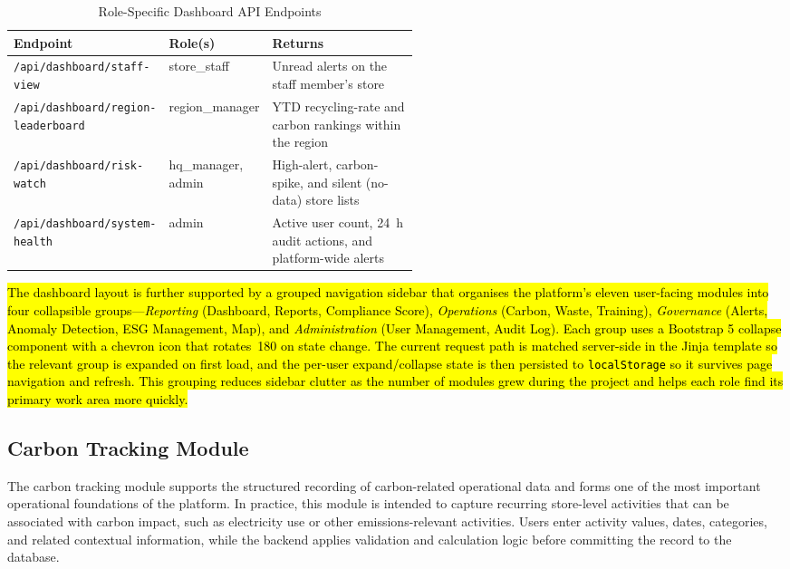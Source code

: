 \documentclass[11pt,a4paper]{article}
\newcommand{\new}[1]{\hl{#1}}
\begin{document}
\begin{table}[h]
\centering
\scriptsize
\begin{tabularx}{\linewidth}{@{}p{0.32\linewidth}p{0.20\linewidth}X@{}}
\toprule
\textbf{Endpoint} & \textbf{Role(s)} & \textbf{Returns} \\
\midrule
\rowcolor{yellow!40}
\texttt{/api/dashboard/staff-view} & store\_staff & Unread alerts on the staff member's store \\
\rowcolor{yellow!40}
\texttt{/api/dashboard/region-leaderboard} & region\_manager & YTD recycling-rate and carbon rankings within the region \\
\rowcolor{yellow!40}
\texttt{/api/dashboard/risk-watch} & hq\_manager, admin & High-alert, carbon-spike, and silent (no-data) store lists \\
\rowcolor{yellow!40}
\texttt{/api/dashboard/system-health} & admin & Active user count, 24~h audit actions, and platform-wide alerts \\
\bottomrule
\end{tabularx}
\caption{Role-Specific Dashboard API Endpoints}
\label{tab:role-dashboard-api}
\end{table}

\new{The dashboard layout is further supported by a grouped navigation sidebar that organises the platform's eleven user-facing modules into four collapsible groups---\emph{Reporting} (Dashboard, Reports, Compliance Score), \emph{Operations} (Carbon, Waste, Training), \emph{Governance} (Alerts, Anomaly Detection, ESG Management, Map), and \emph{Administration} (User Management, Audit Log). Each group uses a Bootstrap 5 collapse component with a chevron icon that rotates~180\textdegree{} on state change. The current request path is matched server-side in the Jinja template so the relevant group is expanded on first load, and the per-user expand/collapse state is then persisted to \texttt{localStorage} so it survives page navigation and refresh. This grouping reduces sidebar clutter as the number of modules grew during the project and helps each role find its primary work area more quickly.}

\subsection{Carbon Tracking Module}
The carbon tracking module supports the structured recording of carbon-related operational data and forms one of the most important operational foundations of the platform. In practice, this module is intended to capture recurring store-level activities that can be associated with carbon impact, such as electricity use or other emissions-relevant activities. Users enter activity values, dates, categories, and related contextual information, while the backend applies validation and calculation logic before committing the record to the database.
\end{document}
